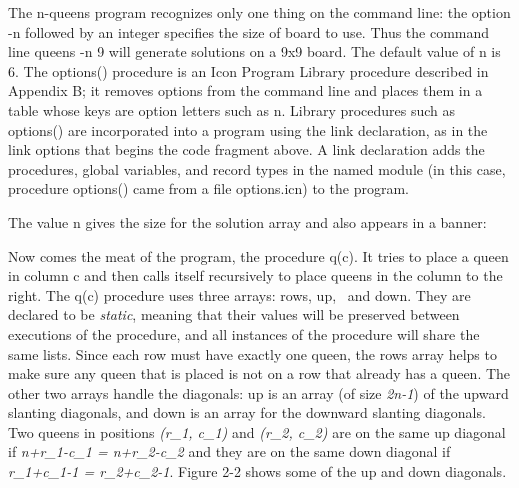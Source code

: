 The n-queens program recognizes only one thing on the command line: the
option \textsf{{}-n} followed by an integer specifies the size of board
to use. Thus the command line \textsf{queens -n 9} will generate
solutions on a 9x9 board. The default value of \textsf{n} is 6. The
\textsf{options()} procedure is an Icon Program
Library procedure described in Appendix B; it removes options from the
command line and places them in a table whose keys are option letters
such as \textsf{{\textquotedbl}n{\textquotedbl}}. Library procedures
such as \textsf{options()} are incorporated into a program using the
\textsf{link} declaration, as in the \textsf{link options}
that begins the code fragment above. A link declaration adds the
procedures, global variables, and record types in the named module (in
this case, procedure \textsf{options()} came from a file
\textsf{options.icn}) to the program.


The value \textsf{n} gives the size for the solution array and also
appears in a banner:


Now comes the meat of the program, the procedure \textsf{q(c)}. It tries
to place a queen in column \textsf{c} and then calls itself recursively
to place queens in the column to the right. The \textsf{q(c)} procedure
uses three arrays: \textsf{rows}, \textsf{up}, \ and \textsf{down}.
They are declared to be \textit{static}, meaning that their values will
be preserved between executions of the procedure, and all
instances of the procedure will share the same lists.
Since each row must have exactly one queen, the rows array helps to
make sure any queen that is placed is not on a row that already has a
queen. The other two arrays handle the diagonals: \textsf{up} is an
array (of size \textit{2n-1}) of the upward slanting diagonals, and
\textsf{down} is an array for the downward slanting diagonals. Two
queens in positions \textit{(r\_1, c\_1)} and \textit{(r\_2, c\_2)} are
on the same {\textquotedbl}up{\textquotedbl} diagonal if
\textit{n+r\_1-c\_1 = n+r\_2-c\_2} and they are on the same
{\textquotedbl}down{\textquotedbl} diagonal if \textit{r\_1+c\_1-1 =
r\_2+c\_2-1}. Figure 2-2 shows some of the
{\textquotedbl}up{\textquotedbl} and {\textquotedbl}down{\textquotedbl}
diagonals.

